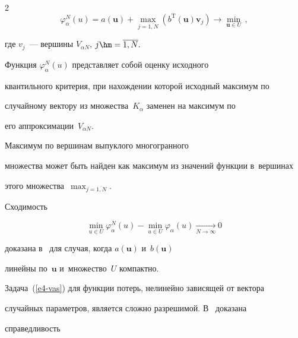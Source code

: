 \begin{multicols}{2}
 \begin{equation*}

\varphi_\alpha^N (u) = a (\mathbf {u}) + \max\limits_{j=\overline{1,N}}

\left(b^{\mathrm{T}}(\mathbf {u}) \mathbf  {v}_j\right) 

\to \min\limits_{\mathbf {u}\in U}\,,


\end{equation*}

где $v_j$~--- вершины $ V_{\alpha N}$,  $j\hm=\overline{1,N}.$ 

Функция $\varphi_\alpha^N (u)$ пред\-став\-ля\-ет собой оценку исходного 

квантильного критерия, при на\-хож\-де\-нии которой исходный максимум по 

случайному век\-то\-ру из множества~$K_\alpha$ заменен на максимум по 

его аппроксимации~$V_{\alpha N}.$ 



Максимум по вершинам выпуклого многогранного 

множества может быть найден как максимум из значений функции в~вершинах 

этого множества~$\max\nolimits_{j=\overline{1,N}}.$







Сходимость

\begin{equation*}

\min\limits_{u\in U} \varphi_\alpha^N (u)-\min\limits_{u\in U} \varphi_\alpha 

(u)\xrightarrow[{N\to \infty}]{} 0


\end{equation*}

доказана в~\cite{vaskan} для случая, когда $a (\mathbf {u})$ и~$b(\mathbf {u})$ 

линейны по~$\mathbf {u}$ и~множество~$U$ компактно.





Задача~(\ref{e4-vas}) для функции потерь, нелинейно зависящей от век\-то\-ра  

случайных па\-ра\-мет\-ров, является слож\-но разрешимой. В~\cite{vaskan2} доказана 

спра\-вед\-ли\-вость\linebreak


\end{multicols}
